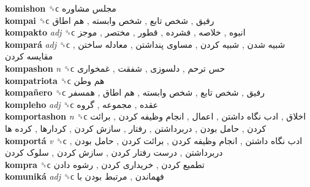\textbf{komishon} ␝ϲ   مجلس مشاوره   \\
\textbf{kompai} ␝ϲ   رفیق ,  شخص تابع ,  شخص وابسته ,  هم اطاق   \\
\textbf{kompakto} \emph{adj}  ␝ϲ   انبوه ,  خلاصه ,  فشرده ,  قطور ,  مختصر ,  موجز   \\
\textbf{kompará} \emph{adj}  ␝ϲ   شبیه شدن ,  شبیه کردن ,  مساوی پنداشتن ,  معادله ساختن ,  مقایسه کردن   \\
\textbf{kompashon} \emph{n}  ␝ϲ   حس ترحم ,  دلسوزی ,  شفقت ,  غمخواری   \\
\textbf{kompatriota} ␝ϲ   هم وطن   \\
\textbf{kompañero} ␝ϲ   رفیق ,  شخص تابع ,  شخص وابسته ,  هم اطاق ,  همسفر   \\
\textbf{kompleho} \emph{adj}  ␝ϲ   عقده ,  مجموعه ,  گروه   \\
\textbf{komportashon} \emph{n}  ␝ϲ   اخلاق ,  ادب نگاه داشتن ,  اعمال ,  انجام وظیفه کردن ,  برائت کردن ,  حامل بودن ,  دربرداشتن ,  رفتار ,  سازش کردن ,  کردارها ,  کرده ها   \\
\textbf{komportá} \emph{v}  ␝ϲ   ادب نگاه داشتن ,  انجام وظیفه کردن ,  برائت کردن ,  حامل بودن ,  دربرداشتن ,  درست رفتار کردن ,  سازش کردن ,  سلوک کردن   \\
\textbf{kompra} ␝ϲ   تطمیع کردن ,  خریداری کردن ,  رشوه دادن   \\
\textbf{komuniká} \emph{adj}  ␝ϲ   فهماندن ,  مرتبط بودن با   \\
